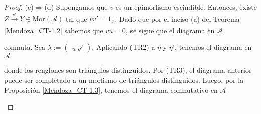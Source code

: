 \documentclass[tesis]{subfiles}
\begin{document}
\begin{proof}
    (c)$\Rightarrow$(d) Supongamos que $v$ es un epimorfismo escindible. Entonces, existe $Z\xrightarrow[]{v'}Y\in\text{Mor}(\mathscr{A})$ tal que $vv'=1_Z$. Dado que por el inciso (a) del Teorema \ref{Mendoza_CT-1.2} sabemos que $vu=0$, se sigue que el diagrama en $\mathscr{A}$
            \begin{center}
           \end{center}
           conmuta. Sea $\lambda:=(\begin{smallmatrix}  u \ v' \end{smallmatrix})$. Aplicando (TR2) a $\eta$ y $\eta'$, tenemos el diagrama en $\mathscr{A}$
    \begin{center}
    \end{center}
    donde los renglones son triángulos distinguidos. Por (TR3), el diagrama anterior puede ser completado a un morfismo de triángulos distinguidos. Luego, por la Proposición \ref{Mendoza_CT-1.3}, tenemos el diagrama conmutativo en $\mathscr{A}$
    \begin{center}

\end{center}
\end{proof}
\end{document}
